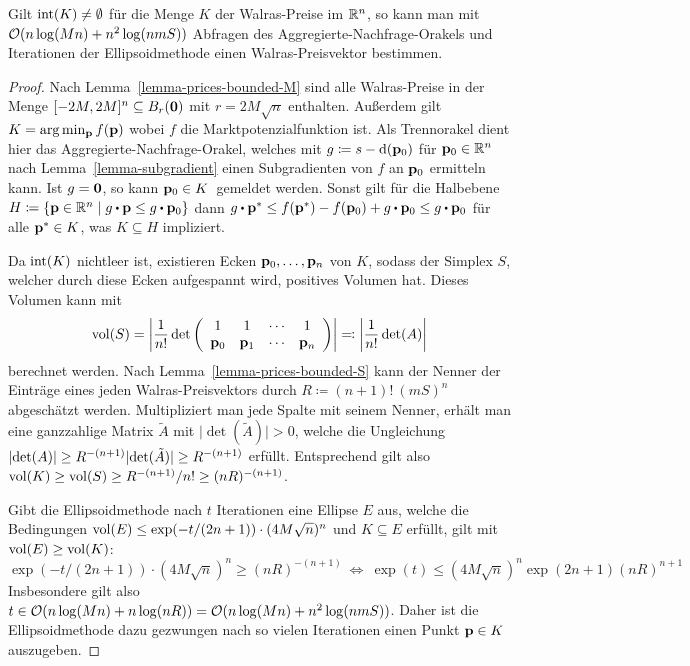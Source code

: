 \begin{theorem}\label{thm-compute-walras-with-ellipsoid}
	Gilt $\operatorname{int}(K) \neq \emptyset$ für die Menge $K$ der Walras-Preise im $\mathbb{R}^n$, so kann man mit $\mathcal{O}(n\log(Mn) + n^2 \log(n m S))$ Abfragen des Aggregierte-Nachfrage-Orakels und Iterationen der Ellipsoidmethode einen Walras-Preisvektor bestimmen.
\end{theorem}
\begin{proof}
	Nach Lemma~\ref{lemma-prices-bounded-M} sind alle Walras-Preise in der Menge $[-2M, 2M]^n\subseteq B_{r}(\mathbf{0})$ mit $r = 2M\sqrt{n}$ enthalten.
	Außerdem gilt $K = \arg\min_{\mathbf{p}} f(\mathbf{p})$ wobei $f$ die Marktpotenzialfunktion ist.
	Als Trennorakel dient hier das Aggregierte-Nachfrage-Orakel, welches mit $g \coloneqq s - \operatorname{d}(\mathbf{p}_0)$ für $\mathbf{p}_0\in\mathbb{R}^n$ nach Lemma~\ref{lemma-subgradient} einen Subgradienten von $f$ an $\mathbf{p}_0$ ermitteln kann.
	Ist $g = \mathbf{0}$, so kann \glqq$\mathbf{p}_0 \in K$\grqq\ gemeldet werden.
	Sonst gilt für die Halbebene $H\coloneqq\{ \fp\in\R^n \mid g\bcdot \fp \leq g\bcdot \fp_0 \}$ dann $g\bcdot \fp^* \leq f(\fp^*) - f(\fp_0) + g \bcdot \fp_0 \leq g \bcdot \fp_0$ für alle $\mathbf{p}^*\in K$, was $K\subseteq H$ impliziert.
	
	Da $\operatorname{int}(K)$ nichtleer ist, existieren Ecken $\mathbf{p}_0, \dots, \mathbf{p}_n$ von $K$, sodass der Simplex $S$, welcher durch diese Ecken aufgespannt wird, positives Volumen hat.
	Dieses Volumen kann mit
	\[ \operatorname{vol}(S) = \left\lvert  \frac{1}{n!} \det\left(  \begin{array}{ccccc}
		1 & 1 & \cdots & 1 \\	
		\mathbf{p}_0 & \mathbf{p}_1 & \cdots & \mathbf{p}_n
	\end{array}  \right) \right\rvert  \eqqcolon \left\lvert  \frac{1}{n!} \det(A)  \right\rvert \]
	berechnet werden.
	Nach Lemma~\ref{lemma-prices-bounded-S} kann der Nenner der Einträge eines jeden Walras-Preisvektors durch $R \coloneqq (n+1)!\ (mS)^n$ abgeschätzt werden.
	Multipliziert man jede Spalte mit seinem Nenner,
	erhält man eine ganzzahlige Matrix $\tilde{A}$ mit $\lvert \det(\tilde{A}) \rvert > 0$,
	welche die Ungleichung $\left\lvert  \det(A)  \right\rvert \geq R^{-(n+1)} \lvert \det(\tilde{A}) \rvert \geq R^{-(n+1)}$ erfüllt.
	Entsprechend gilt also $\operatorname{vol}(K) \geq \operatorname{vol}(S) \geq R^{-(n+1)} / n! \geq (nR)^{-(n+1)}$.
	
	Gibt die Ellipsoidmethode nach $t$ Iterationen eine Ellipse $E$ aus, welche die Bedingungen $\operatorname{vol}(E) \leq \exp(-t / ({2n + 1}))\cdot (4M \sqrt{n})^n$ und $K\subseteq E$ erfüllt, gilt mit $\operatorname{vol}(E) \geq \operatorname{vol}(K)$:
	\[ \exp(-t / ({2n + 1}))\cdot (4M\sqrt{n})^n \geq (nR)^{-(n+1)}
	~ \Leftrightarrow ~ \exp(t) \leq (4M\sqrt{n})^n \exp(2n+1) (nR)^{n+1} \]
	Insbesondere gilt also $t\in\mathcal{O}(n\log(Mn) + n\log(nR)) = \mathcal{O}(n\log(Mn) + n^2 \log(n m S))$.
	Daher ist die Ellipsoidmethode dazu gezwungen nach so vielen Iterationen einen Punkt $\mathbf{p}\in K$ auszugeben.
\end{proof}

